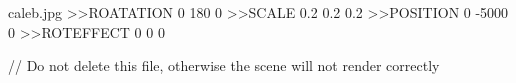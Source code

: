 caleb.jpg
>>ROATATION
0
180
0
>>SCALE
0.2
0.2
0.2
>>POSITION
0
-5000
0
>>ROTEFFECT
0
0
0

// Do not delete this file, otherwise the scene will not render correctly
